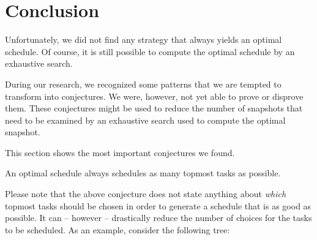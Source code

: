 \section{Conclusion}
\label{sec:p3-conclusion}

Unfortunately, we did not find any strategy that always yields an optimal schedule. Of course, it is still possible to compute the optimal schedule by an exhaustive search.

During our research, we recognized some patterns that we are tempted to transform into conjectures. We were, however, not yet able to prove or disprove them. These conjectures might be used to reduce the number of snapshots that need to be examined by an exhaustive search used to compute the optimal snapshot.

This section shows the most important conjectures we found.

\begin{conjecture}
  \label{conj:as-many-topmost-as-possibly}
  An optimal schedule always schedules as many topmost tasks as possible.
\end{conjecture}

Please note that the above conjecture does not state anything about \emph{which} topmost tasks should be chosen in order to generate a schedule that is as good as possible. It can -- however -- drastically reduce the number of choices for the tasks to be scheduled. As an example, consider the following tree:

